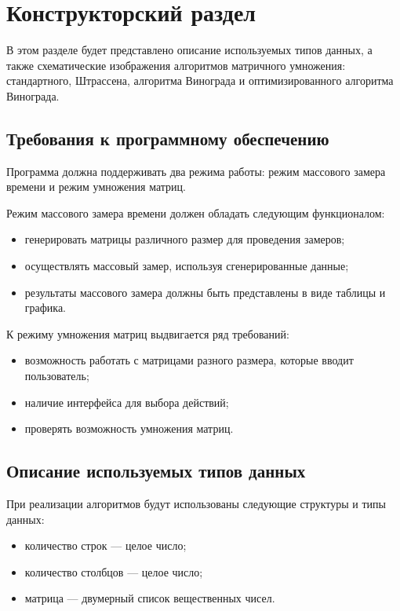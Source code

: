 \chapter{Конструкторский раздел}

В этом разделе будет представлено описание используемых типов данных, а также схематические изображения алгоритмов матричного умножения: стандартного, Штрассена, алгоритма Винограда и оптимизированного алгоритма Винограда.

\section{Требования к программному обеспечению}

Программа должна поддерживать два режима работы: режим массового замера времени и режим умножения матриц.

Режим массового замера времени должен обладать следующим функционалом:
\begin{itemize}
	\item генерировать матрицы различного размер для проведения замеров;
	\item осуществлять массовый замер, используя сгенерированные данные;
	\item результаты массового замера должны быть представлены в виде таблицы и графика.
\end{itemize}

К режиму умножения матриц выдвигается ряд требований:
\begin{itemize}
	\item возможность работать с матрицами разного размера, которые вводит пользователь;
	\item наличие интерфейса для выбора действий;
	\item проверять возможность умножения матриц.
\end{itemize}

\section{Описание используемых типов данных}
При реализации алгоритмов будут использованы следующие структуры и типы данных:
\begin{itemize}
	\item количество строк --- целое число;
	\item количество столбцов --- целое число;
	\item матрица --- двумерный список вещественных чисел.
\end{itemize}

